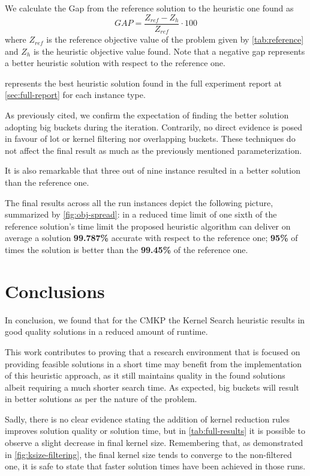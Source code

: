 \documentclass[a4paper, twocolumn, oneside, 10pt]{article}
\begin{document}
We calculate the Gap from the reference solution to the heuristic one found as
\[
	GAP = \frac{Z_{ref}-Z_{h}}{Z_{ref}}\cdot 100
\]
where \(Z_{ref}\) is the reference objective value of the problem given by \cref{tab:reference} and \(Z_h\) is the heuristic objective value found.
Note that a negative gap represents a better heuristic solution with respect to the reference one.

 represents the best heuristic solution found in the full experiment report at \cref{sec:full-report} for each instance type. 

As previously cited, we confirm the expectation of finding the better solution adopting big buckets during the iteration. 
Contrarily, no direct evidence is posed in favour of lot or kernel filtering nor overlapping buckets. These techniques do not affect the final result as much as the previously mentioned parameterization.

It is also remarkable that three out of nine instance resulted in a better solution than the reference one.

The final results across all the run instances depict the following picture, summarized by \cref{fig:obj-spread}: in a reduced time limit of one sixth of the reference solution's time limit the proposed heuristic algorithm can deliver on average a solution \textbf{99.787\%} accurate with respect to the reference one; \textbf{95\%} of times the solution is better than the \textbf{99.45\%} of the reference one.

\section{Conclusions}

In conclusion, we found that for the \ac{CMKP} the Kernel Search heuristic results in good quality solutions in a reduced amount of runtime. 

This work contributes to proving that a research environment that is focused on providing feasible solutions in a short time may benefit from the implementation of this heuristic approach, as it still maintains quality in the found solutions albeit requiring a much shorter search time.
As expected, big buckets will result in better solutions as per the nature of the problem.

Sadly, there is no clear evidence stating the addition of kernel reduction rules improves solution quality or solution time, but in \cref{tab:full-results} it is possible to observe a slight decrease in final kernel size.
Remembering that, as demonstrated in \cref{fig:ksize-filtering}, the final kernel size tends to converge to the non-filtered one, it is safe to state that faster solution times have been achieved in those runs.
\end{document}
